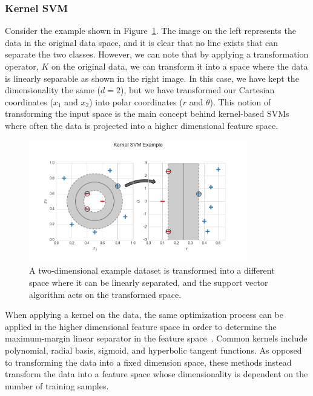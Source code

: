 \subsubsection{Kernel SVM}

Consider the example shown in Figure~\ref{fig:kernelSvmExample}.
%
The image on the left represents the data in the original data space, and it is clear that no line exists that can separate the two classes.
%
However, we can note that by applying a transformation operator, $K$ on the original data, we can transform it into a space where the data is linearly separable as shown in the right image.
%
In this case, we have kept the dimensionality the same ($d=2$), but we have transformed our Cartesian coordinates ($x_1$ and $x_2$) into polar coordinates ($r$ and $\theta$).
%
This notion of transforming the input space is the main concept behind kernel-based SVMs where often the data is projected into a higher dimensional feature space.

\begin{figure}[b]
  \centering
  \includegraphics[width=0.85\textwidth]{figs/chap3/kernelSvmExample}
  \caption[Kernel Support Vector Machine Example]{A two-dimensional example dataset is transformed into a different space where it can be linearly separated, and the support vector algorithm acts on the transformed space.}
  \label{fig:kernelSvmExample}
\end{figure}

When applying a kernel on the data, the same optimization process can be applied in the higher dimensional feature space in order to determine the maximum-margin linear separator in the feature space~\cite{BoserGuyonVapnik1992}.
%
Common kernels include polynomial, radial basis, sigmoid, and hyperbolic tangent functions.
%
As opposed to transforming the data into a fixed dimension space, these methods instead transform the data into a feature space whose dimensionality is dependent on the number of training samples.

